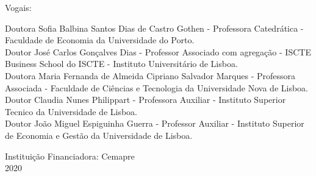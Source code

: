 \begin{titlepage}
\begin{center}
\begin{flushleft}
Vogais:\\
\begin{adjustwidth}{0pt}{-10pt}
Doutora Sofia Balbina Santos Dias de Castro Gothen - Professora Catedrática - Faculdade de Economia da Universidade do Porto. \\
Doutor José Carlos Gonçalves Dias - Professor Associado com agregação - ISCTE Business School do ISCTE - Instituto Universitário de Lisboa.\\
Doutora Maria Fernanda de Almeida Cipriano Salvador Marques - Professora Associada - Faculdade de Ciências e Tecnologia da Universidade Nova de Lisboa.\\ 
Doutor Claudia Nunes Philippart - Professora Auxiliar - Instituto Superior Tecnico da Universidade de Lisboa.\\
Doutor João Miguel Espiguinha Guerra - Professor Auxiliar - Instituto Superior de Economia e Gestão da Universidade de Lisboa.
\end{adjustwidth} 
\end{flushleft}
\vspace{1.5em}

{Instituição Financiadora:  Cemapre}\\
\vspace{0.5em}
{\large 2020}

\end{center}
\end{titlepage}